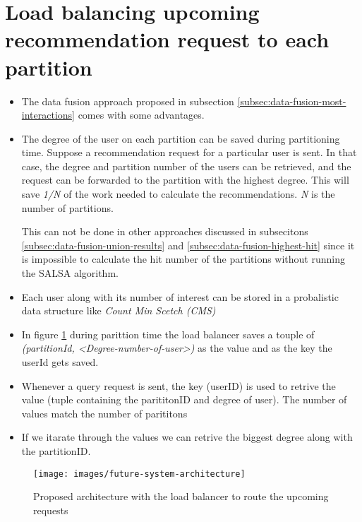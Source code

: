 \section{Load balancing upcoming recommendation request to each partition}

\begin{itemize}
    \item The data fusion approach proposed in subsection \ref{subsec:data-fusion-most-interactions} comes with some advantages.
    \item The degree of the user on each partition can be saved during partitioning time. Suppose a recommendation request for a particular user is sent. In that case, the degree and partition number of the users can be retrieved, and the request can be forwarded to the partition with the highest degree. This will save \emph{1/N} of the work needed to calculate the recommendations. \emph{N} is the number of partitions. 
    
    This can not be done in other approaches discussed in subsecitons \ref{subsec:data-fusion-union-results} and \ref{subsec:data-fusion-highest-hit} since it is impossible to calculate the hit number of the partitions without running the SALSA algorithm.

    \item Each user along with its number of interest can be stored in a probalistic data structure like \emph{Count Min Scetch (CMS)} \cite{cormode2005improved} 
    \item In figure \ref{fig:loadbalancer} during parittion time the load balancer saves a touple of \emph{(partitionId, <Degree-number-of-user>)} as the value and as the key the userId gets saved. 
    \item Whenever a query request is sent, the key (userID) is used to retrive the value (tuple containing the parititonID and degree of user). The number of values match the number of parititons
    \item If we itarate through the values we can retrive the biggest degree along with the partitionID.
\end{itemize}



\begin{figure}[!h]
	\centering
	\texttt{[image: images/future-system-architecture]}
	\caption{Proposed architecture with the load balancer to route the upcoming requests}
	\label{fig:loadbalancer}
\end{figure}